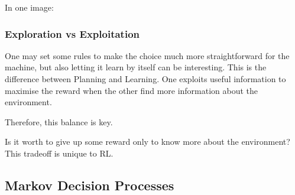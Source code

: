In one image:


\subsubsection{Exploration vs Exploitation}
One may set some rules to make the choice much more straightforward for the machine, but also letting it learn by itself can be interesting. This is the difference between Planning and Learning. One exploits useful information to maximise the reward when the other find more information about the environment.


Therefore, this balance is key.

Is it worth to give up some reward only to know more about the environment? This tradeoff is unique to RL.



\subsection{Markov Decision Processes}

